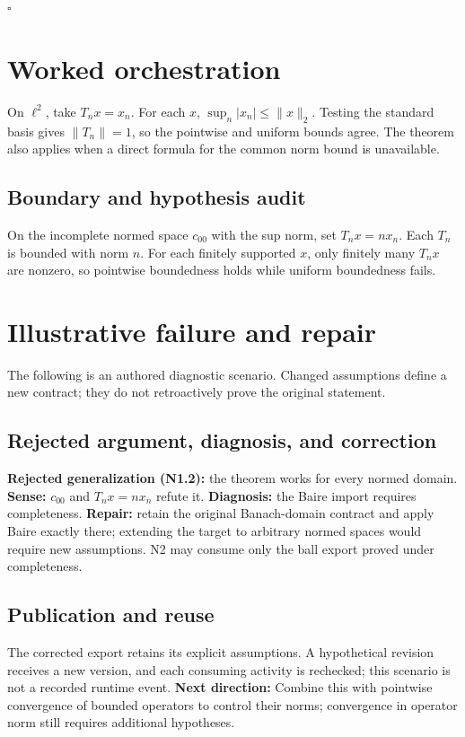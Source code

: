 \documentclass[preprint,12pt,aps,pra,showkeys,amsmath,amssymb,superscriptaddress,floatfix]{revtex4-2}
\theoremstyle{definition}
\theoremstyle{remark}
\begin{document}
\hfill$\square$

\section{Worked orchestration}

On \(\ell^2\), take \(T_nx=x_n\). For each \(x\),
\(\sup_n|x_n|\le\|x\|_2\). Testing the standard basis gives
\(\|T_n\|=1\), so the pointwise and uniform bounds agree. The theorem
also applies when a direct formula for the common norm bound is
unavailable.

\subsection{Boundary and hypothesis audit}

On the incomplete normed space \(c_{00}\) with the sup norm, set
\(T_nx=n x_n\). Each \(T_n\) is bounded with norm \(n\). For each
finitely supported \(x\), only finitely many \(T_nx\) are nonzero, so
pointwise boundedness holds while uniform boundedness fails.

\section{Illustrative failure and repair}

The following is an authored diagnostic scenario. Changed assumptions
define a new contract; they do not retroactively prove the original
statement.

\subsection{Rejected argument, diagnosis, and correction}
\textbf{Rejected generalization (N1.2):} the theorem works for every
normed domain. \textbf{Sense:} \(c_{00}\) and \(T_nx=nx_n\) refute it.
\textbf{Diagnosis:} the Baire import requires completeness.
\textbf{Repair:} retain the original Banach-domain contract and apply
Baire exactly there; extending the target to arbitrary normed spaces
would require new assumptions. N2 may consume only the ball export
proved under completeness.

\subsection{Publication and reuse}
The corrected export retains its explicit assumptions. A hypothetical
revision receives a new version, and each consuming activity is
rechecked; this scenario is not a recorded runtime event. \textbf{Next
direction:} Combine this with pointwise convergence of bounded operators
to control their norms; convergence in operator norm still requires
additional hypotheses.
\end{document}
